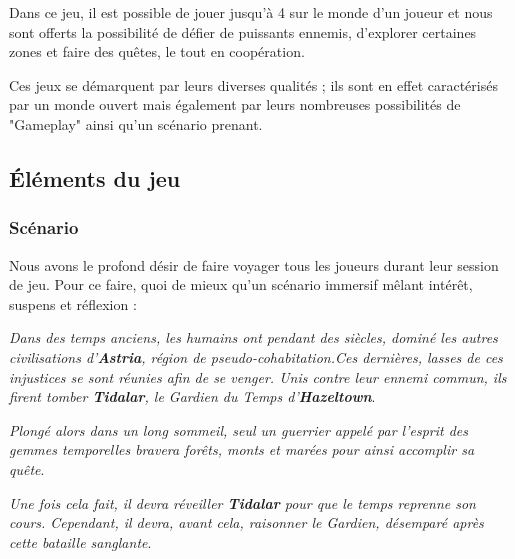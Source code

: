 \documentclass[12pt]{article}
\begin{document}
                \par Dans ce jeu, il est possible de jouer jusqu'à 4 sur le monde d'un joueur et nous sont offerts la possibilité de défier de puissants ennemis, d'explorer certaines zones et faire des quêtes, le tout en coopération.
                \\
                \par Ces jeux se démarquent par leurs diverses qualités ; ils sont en effet caractérisés par un monde ouvert mais également par leurs nombreuses possibilités de "Gameplay" ainsi qu'un scénario prenant.
                \clearpage

        \subsection{Éléments du jeu}
            \subsubsection{Scénario}
    
                Nous avons le profond désir de faire voyager tous les joueurs durant leur session de jeu. Pour ce faire, quoi de mieux qu'un scénario immersif mêlant intérêt, suspens et réflexion :
                \\
                \par 
                \textit{Dans des temps anciens, les humains ont pendant des siècles, dominé les autres civilisations d'\textbf{Astria}, région de pseudo-cohabitation.Ces dernières, lasses de ces injustices se sont réunies afin de se venger. Unis contre leur ennemi commun, ils firent tomber \textbf{Tidalar}, le Gardien du Temps d'\textbf{Hazeltown}}.
                \\

                
                \par 
                \textit {
                    Plongé alors dans un long sommeil, seul un guerrier appelé par l'esprit des gemmes temporelles bravera forêts, monts et marées pour ainsi accomplir sa quête}.
                \\

                \par 
                \textit {
                    Une fois cela fait, il devra réveiller \textbf{Tidalar} pour que le temps reprenne son cours. Cependant, il devra, avant cela, raisonner le Gardien, désemparé après cette bataille sanglante}.
                
\end{document}
